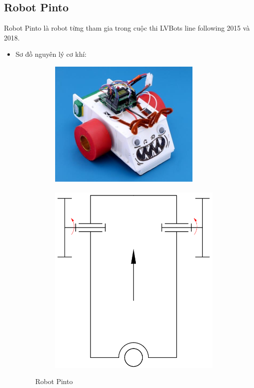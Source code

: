     \subsection{Robot Pinto}
    \hspace*{0.6cm} Robot Pinto là robot từng tham gia trong cuộc thi LVBots line following 2015 và 2018.
    \begin{itemize}
        \item Sơ đồ nguyên lý cơ khí:
        \begin{figure}[H]
            \begin{subfigure}{0.5\textwidth}
            \centering
            \includegraphics[width=0.6\linewidth, right]{pictures/chapter1/chapter1_pic11a_pinto.png} 
            \label{chap1_pic11a}
            \end{subfigure}
            \begin{subfigure}{0.6\textwidth}
            \includegraphics[width=0.5\linewidth]{pictures/chapter1/chapter1_pic11b_pinto.png}
            \label{chap1_pic11b}
            \end{subfigure}
            \caption{Robot Pinto}
            \label{chap1_pic11}
        \end{figure}

\end{itemize}
